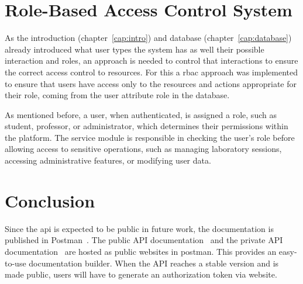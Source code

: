 \section{Role-Based Access Control System}
As the introduction (chapter~\ref{cap:intro}) and database (chapter~\ref{cap:database}) already introduced what user types the system has as well their possible interaction and roles, an approach is needed to control that interactions to ensure the correct access control to resources. For this a \acf{rbac} approach was implemented to ensure that users have access only to the resources and actions appropriate for their role, coming from the user attribute role in the database. 

As mentioned before, a user, when authenticated, is assigned a role, such as student, professor, or administrator, which determines their permissions within the platform. The service module is responsible in checking the user's role before allowing access to sensitive operations, such as managing laboratory sessions, accessing administrative features, or modifying user data. 

\section{Conclusion}

Since the \acs{api} is expected to be public in future work, the documentation is published in Postman~\cite{postman}. The public API documentation~\cite{public-api-documentation} and the private API documentation~\cite{private-api-documentation} are hosted as public websites in postman. This provides an easy-to-use documentation builder. When the API reaches a stable version and is made public, users will have to generate an authorization token via website. 
